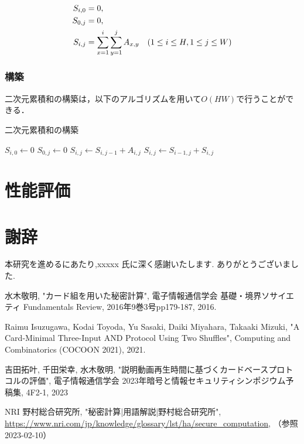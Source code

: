 \documentclass{jsreport}
\theoremstyle{plain} %
\theoremstyle{definition}
\begin{document}
\begin{align}
    S_{i, 0} &= 0, \notag \\
    S_{0, j} &= 0, \notag \\
    S_{i, j} &= \sum_{x=1}^{i} \sum_{y=1}^{j} A_{x, y} \quad (1 \leq i \leq H, 1 \leq j \leq W)
\end{align}

\subsection{構築}
二次元累積和の構築は，以下のアルゴリズムを用いて$O(HW)$で行うことができる．

\begin{algorithm}
    \caption{二次元累積和の構築}
    \begin{algorithmic}[1]
        \STATE $S_{i, 0} \leftarrow 0$
        \ENDFOR
        \STATE $S_{0, j} \leftarrow 0$
        \ENDFOR
        \STATE $S_{i, j} \leftarrow S_{i,j-1} + A_{i,j}$
        \ENDFOR
        \ENDFOR
        \STATE $S_{i, j} \leftarrow S_{i-1,j} + S_{i,j}$
        \ENDFOR
        \ENDFOR
    \end{algorithmic}
\end{algorithm}

\chapter{性能評価}

\chapter*{謝辞}
本研究を進めるにあたり,xxxxx 氏に深く感謝いたします. ありがとうございました.

\begin{thebibliography}{99}
水木敬明, "カード組を用いた秘密計算", 電子情報通信学会 基礎・境界ソサイエティ Fundamentals Review, 2016年9巻3号pp179-187, 2016.

Raimu Isuzugawa, Kodai Toyoda, Yu Sasaki, Daiki Miyahara, Takaaki Mizuki, "A Card-Minimal Three-Input AND Protocol Using Two Shuffles", Computing and Combinatorics (COCOON 2021), 2021.



吉田拓叶, 千田栄幸, 水木敬明, "説明動画再生時間に基づくカードベースプロトコルの評価", 電子情報通信学会 2023年暗号と情報セキュリティシンポジウム予稿集, 4F2-1, 2023

NRI 野村総合研究所, "秘密計算|用語解説|野村総合研究所", \url{https://www.nri.com/jp/knowledge/glossary/lst/ha/secure_computation}, （参照2023-02-10）

\end{thebibliography}
\end{document}
